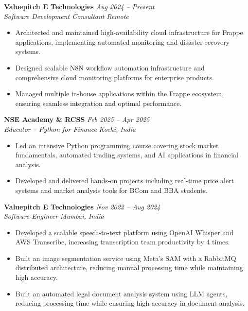 \documentclass[11pt,a4paper]{article}
\begin{document}
\textbf{Valuepitch E Technologies} \hfill \textit{Aug 2024 -- Present} \\
\textit{Software Development Consultant} \hfill \textit{Remote}
\begin{itemize}[leftmargin=*, itemsep=2pt, topsep=4pt, parsep=0pt]
    \item Architected and maintained high-availability cloud infrastructure for Frappe applications, implementing automated monitoring and disaster recovery systems.
    \item Designed scalable N8N workflow automation infrastructure and comprehensive cloud monitoring platforms for enterprise products.
    \item Managed multiple in-house applications within the Frappe ecosystem, ensuring seamless integration and optimal performance.
\end{itemize}

\textbf{NSE Academy \& RCSS} \hfill \textit{Feb 2025 -- Apr 2025} \\
\textit{Educator -- Python for Finance} \hfill \textit{Kochi, India}
\begin{itemize}[leftmargin=*, itemsep=2pt, topsep=4pt, parsep=0pt]
    \item Led an intensive Python programming course covering stock market fundamentals, automated trading systems, and AI applications in financial analysis.
    \item Developed and delivered hands-on projects including real-time price alert systems and market analysis tools for BCom and BBA students.
\end{itemize}

\textbf{Valuepitch E Technologies} \hfill \textit{Nov 2022 -- Aug 2024} \\
\textit{Software Engineer} \hfill \textit{Mumbai, India}
\begin{itemize}[leftmargin=*, itemsep=2pt, topsep=4pt, parsep=0pt]
    \item Developed a scalable speech-to-text platform using OpenAI Whisper and AWS Transcribe, increasing transcription team productivity by 4 times.
    \item Built an image segmentation service using Meta's SAM with a RabbitMQ distributed architecture, reducing manual processing time while maintaining high accuracy.
    \item Built an automated legal document analysis system using LLM agents, reducing processing time while ensuring high accuracy in document analysis.
\end{itemize}
\end{document}
